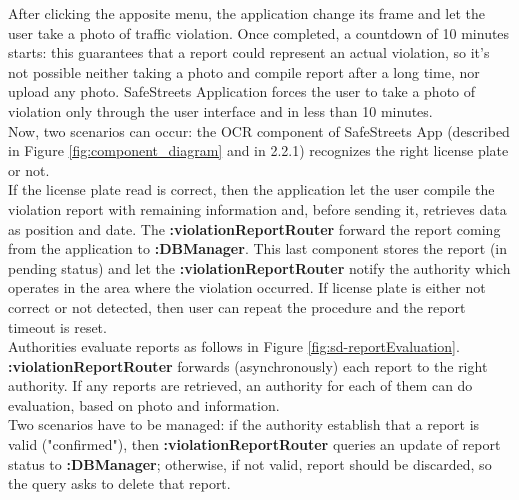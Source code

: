 \documentclass{article}
\begin{document}
			After clicking the apposite menu, the application change its frame and let the user take a photo of traffic violation. Once completed, a countdown of 10 minutes starts: this guarantees that a report could represent an actual violation, so it's not possible neither taking a photo and compile report after a long time, nor upload any photo. SafeStreets Application forces the user to take a photo of violation only through the user interface and in less than 10 minutes.\\
			Now, two scenarios can occur: the OCR component of SafeStreets App (described in Figure \ref{fig:component_diagram} and in 2.2.1) recognizes the right license plate or not.\\
			If the license plate read is correct, then the application let the user compile the violation report with remaining information and, before sending it, retrieves data as position and date. 
			The \textbf{:violationReportRouter} forward the report coming from the application to \textbf{:DBManager}.
			This last component stores the report (in pending status) and let the \textbf{:violationReportRouter} notify the authority which operates in the area where the violation occurred. 
			If license plate is either not correct or not detected, then user can repeat the procedure and the report timeout is reset.\\
			
			Authorities evaluate reports as follows in Figure \ref{fig:sd-reportEvaluation}.\\
			\textbf{:violationReportRouter} forwards (asynchronously) each report to the right authority. If any reports are retrieved, an authority for each of them can do evaluation, based on photo and information.\\
			Two scenarios have to be managed: if the authority establish that a report is valid ("confirmed"), then \textbf{:violationReportRouter} queries an update of report status to \textbf{:DBManager}; otherwise, if not valid, report should be discarded, so the query asks to delete that report.
			
\end{document}

